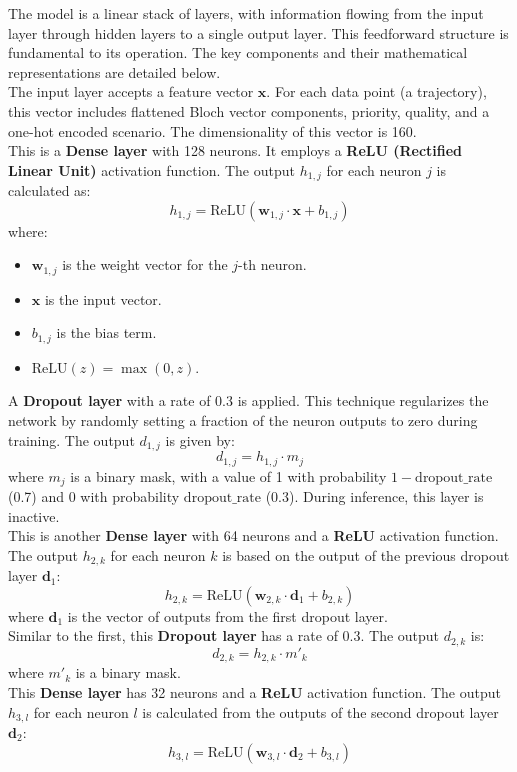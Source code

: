 \documentclass{article}
\begin{document}
The model is a linear stack of layers, with information flowing from the input layer through hidden layers to a single output layer. This feedforward structure is fundamental to its operation. The key components and their mathematical representations are detailed below.\\
The input layer accepts a feature vector $\mathbf{x}$. For each data point (a trajectory), this vector includes flattened Bloch vector components, priority, quality, and a one-hot encoded scenario. The dimensionality of this vector is 160.\\
This is a \textbf{Dense layer} with 128 neurons. It employs a \textbf{ReLU (Rectified Linear Unit)} activation function. The output $h_{1,j}$ for each neuron $j$ is calculated as:
$$h_{1,j} = \text{ReLU}(\mathbf{w}_{1,j} \cdot \mathbf{x} + b_{1,j})$$
where:
\begin{itemize}
    \item $\mathbf{w}_{1,j}$ is the weight vector for the $j$-th neuron.
    \item $\mathbf{x}$ is the input vector.
    \item $b_{1,j}$ is the bias term.
    \item $\text{ReLU}(z) = \max(0, z)$.
\end{itemize}
A \textbf{Dropout layer} with a rate of 0.3 is applied. This technique regularizes the network by randomly setting a fraction of the neuron outputs to zero during training. The output $d_{1,j}$ is given by:
$$d_{1,j} = h_{1,j} \cdot m_j$$
where $m_j$ is a binary mask, with a value of 1 with probability $1 - \text{dropout\_rate}$ (0.7) and 0 with probability $\text{dropout\_rate}$ (0.3). During inference, this layer is inactive.\\
This is another \textbf{Dense layer} with 64 neurons and a \textbf{ReLU} activation function. The output $h_{2,k}$ for each neuron $k$ is based on the output of the previous dropout layer $\mathbf{d}_1$:
$$h_{2,k} = \text{ReLU}(\mathbf{w}_{2,k} \cdot \mathbf{d}_1 + b_{2,k})$$
where $\mathbf{d}_1$ is the vector of outputs from the first dropout layer.\\
Similar to the first, this \textbf{Dropout layer} has a rate of 0.3. The output $d_{2,k}$ is:
$$d_{2,k} = h_{2,k} \cdot m'_k$$
where $m'_k$ is a binary mask.\\
This \textbf{Dense layer} has 32 neurons and a \textbf{ReLU} activation function. The output $h_{3,l}$ for each neuron $l$ is calculated from the outputs of the second dropout layer $\mathbf{d}_2$:
$$h_{3,l} = \text{ReLU}(\mathbf{w}_{3,l} \cdot \mathbf{d}_2 + b_{3,l})$$
\end{document}
